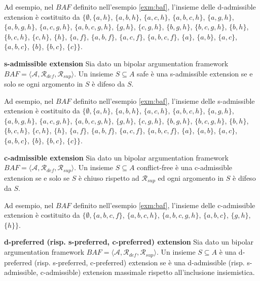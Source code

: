 Ad esempio, nel $BAF$ definito nell'esempio \ref{exm:baf}, l'insieme delle d-admissible extension è costituito da $\{∅, \{a, h\}$, $\{a, b, h\}$, $\{a, c, h\}$, $\{a, b, c, h\}$, $\{a, g, h\}$, $\{a, b, g, h\}$, $\{a, c, g, h\}$, $\{a, b, c, g, h\}$, $\{g, h\}$, $\{c, g, h\}$, $\{b, g, h\}$, $\{b, c, g, h\}$, $\{b, h\}$, $\{b, c, h\}$, $\{c, h\}$, $\{h\}$, $\{a, f\}$, $\{a, b, f \}$, $\{a, c, f \}$, $\{a, b, c, f \}$, $\{a\}$, $\{a, b\}$, $\{a, c\}$, $\{a, b, c\}$, $\{b\}$, $\{b, c\}$, $\{c\}\}$.


\bigskip
\begin{defn} \textbf{s-admissible extension} 
Sia dato un bipolar argumentation framework $BAF = ⟨\mathcal{A}, \mathcal{R}_{def}, \mathcal{R}_{sup}⟩$. Un insieme $S \subseteq A$ safe è una s-admissible extension se e solo se ogni argomento in $S$ è difeso da $S$.
\end{defn}

Ad esempio, nel $BAF$ definito nell'esempio \ref{exm:baf}, l'insieme delle s-admissible extension è costituito da $\{∅, \{a, h\}$, $\{a, b, h\}$, $\{a, c, h\}$, $\{a, b, c, h\}$, $\{a, g, h\}$, $\{a, b, g, h\}$, $\{a, c, g, h\}$, $\{a, b, c, g, h\}$, $\{g, h\}$, $\{c, g, h\}$, $\{b, g, h\}$, $\{b, c, g, h\}$, $\{b, h\}$, $\{b, c, h\}$, $\{c, h\}$, $\{h\}$, $\{a, f \}$, $\{a, b, f \}$, $\{a, c, f \}$, $\{a, b, c, f \}$, $\{a\}$, $\{a, b\}$, $\{a, c\}$, $\{a, b, c\}$, $\{b\}$, $\{b, c\}$, $\{c\}\}$.


\bigskip
\begin{defn} \textbf{c-admissible extension}
Sia dato un bipolar argumentation framework $BAF = ⟨\mathcal{A}, \mathcal{R}_{def}, \mathcal{R}_{sup}⟩$. Un insieme $S \subseteq A$ conflict-free è una c-admissible extension se e solo se $S$ è chiuso rispetto ad $\mathcal{R}_{sup}$ ed ogni argomento in $S$ è difeso da $S$.
\end{defn}

Ad esempio, nel $BAF$ definito nell'esempio \ref{exm:baf}, l'insieme delle c-admissible extension è costituito da $\{∅, \{a, b, c, f \}$, $\{a, b, c, h\}$, $\{a, b, c, g, h\}$, $\{a, b, c\}$, $\{g, h\}$, $\{h\}\}$.


\bigskip
\begin{defn} \textbf{d-preferred (risp. s-preferred, c-preferred) extension}
Sia dato un bipolar argumentation framework $BAF = ⟨\mathcal{A}, \mathcal{R}_{def}, \mathcal{R}_{sup}⟩$. Un insieme $S \subseteq A$ è una d-preferred (risp. s-preferred, c-preferred) extension se è una d-admissible (risp. s-admissible, c-admissible) extension massimale rispetto all'inclusione insiemistica.
\end{defn}


